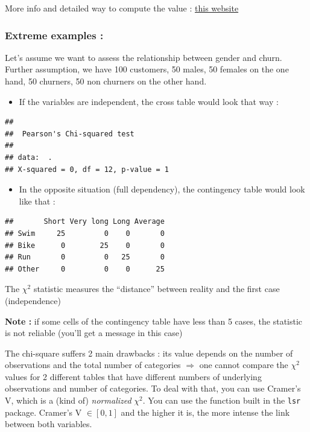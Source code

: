 \documentclass[
]{book}
\providecommand{\tightlist}{%
  \setlength{\itemsep}{0pt}\setlength{\parskip}{0pt}}
\begin{document}
More info and detailed way to compute the value : \href{https://www.statisticshowto.com/probability-and-statistics/chi-square/}{this website}

\hypertarget{extreme-examples}{%
\subsubsection{Extreme examples :}\label{extreme-examples}}

Let's assume we want to assess the relationship between gender and churn. Further assumption, we have 100 customers, 50 males, 50 females on the one hand, 50 churners, 50 non churners on the other hand.

\begin{itemize}
\tightlist
\item
  If the variables are independent, the cross table would look that way :
\end{itemize}

\begin{verbatim}
## 
## 	Pearson's Chi-squared test
## 
## data:  .
## X-squared = 0, df = 12, p-value = 1
\end{verbatim}

\begin{itemize}
\tightlist
\item
  In the opposite situation (full dependency), the contingency table would look like that :
\end{itemize}

\begin{verbatim}
##       Short Very long Long Average
## Swim     25         0    0       0
## Bike      0        25    0       0
## Run       0         0   25       0
## Other     0         0    0      25
\end{verbatim}

The \(\chi^2\) statistic measures the ``distance'' between reality and the first case (independence)

\textbf{Note :} if some cells of the contingency table have less than 5 cases, the statistic is not reliable (you'll get a message in this case)

The chi-square suffers 2 main drawbacks : its value depends on the number of observations and the total number of categories \(\Rightarrow\) one cannot compare the \(\chi^2\) values for 2 different tables that have different numbers of underlying observations and number of categories.
To deal with that, you can use Cramer's V, which is a (kind of) \emph{normalized} \(\chi^2\). You can use the function built in the \texttt{lsr} package. Cramer's V \(\in [0,1]\) and the higher it is, the more intense the link between both variables.
\end{document}
